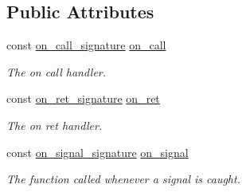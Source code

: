 \subsection*{Public Attributes}
\begin{DoxyCompactItemize}
\item 
const \hyperlink{class_s_s_handlers_ac55de17666a40e5d50d854ef65f01be9}{on\+\_\+call\+\_\+signature} \hyperlink{class_s_s_handlers_a2cd9221058871db09200f523f78bfb03}{on\+\_\+call}
\begin{DoxyCompactList}\small\item\em The \textquotesingle{}on call\textquotesingle{} handler. \end{DoxyCompactList}\item 
const \hyperlink{class_s_s_handlers_ade1360265360f4e67c782a00951850ab}{on\+\_\+ret\+\_\+signature} \hyperlink{class_s_s_handlers_a2044718e6183b14442c9bc9295b3dda2}{on\+\_\+ret}
\begin{DoxyCompactList}\small\item\em The \textquotesingle{}on ret\textquotesingle{} handler. \end{DoxyCompactList}\item 
const \hyperlink{class_s_s_handlers_a63287bfa685457954f9bed08635dca2d}{on\+\_\+signal\+\_\+signature} \hyperlink{class_s_s_handlers_a9933cca29ab671706a5df494e3fb3532}{on\+\_\+signal}
\begin{DoxyCompactList}\small\item\em The function called whenever a signal is caught. \end{DoxyCompactList}\end{DoxyCompactItemize}
